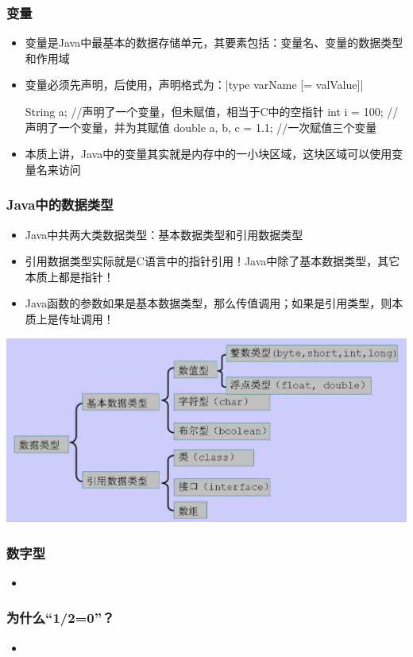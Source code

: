 \begin{frame}[fragile]
  \frametitle{变量}
  \begin{itemize}
    \item 变量是Java中最基本的数据存储单元，其要素包括：变量名、变量的数据类型和作用域
    \item 变量必须先声明，后使用，声明格式为：\java|type varName [= valValue]|
    \begin{javacode}
      String a; //声明了一个变量，但未赋值，相当于C中的空指针
      int i = 100; //声明了一个变量，并为其赋值
      double a, b, c = 1.1; //一次赋值三个变量
    \end{javacode}
    \item 本质上讲，Java中的变量其实就是内存中的一小块区域，这块区域可以使用变量名来访问
  \end{itemize}
\end{frame}

\begin{frame}
  \frametitle{Java中的数据类型}
  \begin{itemize}
    \item Java中共两大类数据类型：基本数据类型和引用数据类型
    \item 引用数据类型实际就是C语言中的指针引用！Java中除了基本数据类型，其它本质上都是指针！
    \item Java函数的参数如果是基本数据类型，那么传值调用；如果是引用类型，则本质上是传址调用！
  \end{itemize}
  \includegraphics[width=\textwidth]{figures/data_types}
\end{frame}

\begin{frame}
  \frametitle{数字型}
  \begin{itemize}
    \item 
  \end{itemize}
\end{frame}

\begin{frame}
  \frametitle{为什么“1/2=0”？}
  \begin{itemize}
    \item 
  \end{itemize}
\end{frame}

